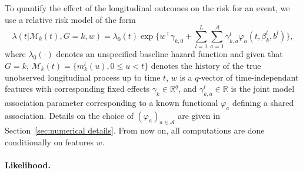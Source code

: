 \documentclass[11pt]{article}
\newcommand{\cM}{\mathcal M}
\newcommand{\cA}{\mathcal A}
\newcommand{\R}{\mathds R}
\begin{document}
To quantify the effect of the longitudinal outcomes on the risk for an event, we use a relative risk model of the form
\begin{equation}
	\label{eq:intensity-model}
	\lambda(t|\cM_k(t), G = k, w) = \lambda_0(t) \exp \Big\{ w^\top \gamma_{k,0} + \sum_{l=1}^L \sum_{a=1}^\cA \gamma_{k,a}^l \varphi_a(t, \beta_k^l, b^l) \Big\},
\end{equation}
where $\lambda_0(\cdot)$ denotes an unspecified baseline hazard function and given that $G = k$, $\cM_k(t) = \{m_k^l(u), 0 \leq u < t\}$ denotes the history of the true unobserved longitudinal process up to time $t$, $w$ is a $q$-vector of time-independant features with corresponding fixed effects $\gamma_k \in \R^q$, and $\gamma_{k,a}^l \in \R$ is the joint model association parameter corresponding to a known functional $\varphi_a$ defining a shared association. Details on the choice of $(\varphi_a)_{a \in \cA}$ are given in Section~\ref{sec:numerical details}. From now on, all computations are done conditionally on features $w$.
 
\paragraph{Likelihood.}
\end{document}
